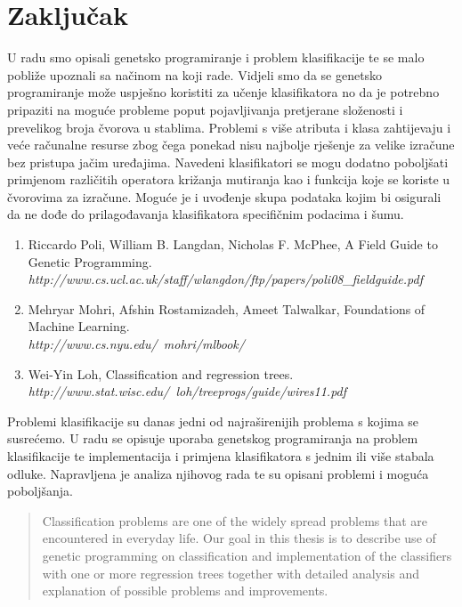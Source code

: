 \documentclass[times, utf8, zavrsni]{fer}
\begin{document}
\chapter{Zaključak}
U radu smo opisali genetsko programiranje i problem klasifikacije te se malo pobliže upoznali sa načinom na koji rade. Vidjeli smo da se genetsko programiranje može uspješno koristiti za učenje klasifikatora no da je potrebno pripaziti na moguće probleme poput pojavljivanja pretjerane složenosti i prevelikog broja čvorova u stablima. Problemi s više atributa i klasa zahtijevaju i veće računalne resurse zbog čega ponekad nisu najbolje rješenje za velike izračune bez pristupa jačim uređajima. Navedeni klasifikatori se mogu dodatno poboljšati primjenom različitih operatora križanja mutiranja kao i funkcija koje se koriste u čvorovima za izračune. Moguće je i uvođenje skupa podataka kojim bi osigurali da ne dođe do prilagođavanja klasifikatora specifičnim podacima i šumu.





\begin{enumerate}
	\item Riccardo Poli, William B. Langdan, Nicholas F. McPhee, A Field Guide to Genetic Programming. \\
	\emph{http://www.cs.ucl.ac.uk/staff/wlangdon/ftp/papers/poli08\_fieldguide.pdf}

	\item Mehryar Mohri, Afshin Rostamizadeh, Ameet Talwalkar, Foundations of Machine Learning. \\
	\emph{http://www.cs.nyu.edu/~mohri/mlbook/}

	\item Wei-Yin Loh, Classification and regression trees. \\
	\emph{http://www.stat.wisc.edu/~loh/treeprogs/guide/wires11.pdf}
\end{enumerate}


\begin{sazetak}
Problemi klasifikacije su danas jedni od najraširenijih problema s kojima se susrećemo. U radu se opisuje uporaba genetskog programiranja na problem klasifikacije te implementacija i primjena klasifikatora s jednim ili više stabala odluke. Napravljena je analiza njihovog rada te su opisani problemi i moguća poboljšanja.

\end{sazetak}

\begin{abstract}
Classification problems are one of the widely spread problems that are encountered in everyday life. Our goal in this thesis is to describe use of genetic programming on classification and implementation of the classifiers with one or more regression trees together with detailed analysis and explanation of possible problems and improvements.

\end{abstract}
\end{document}
